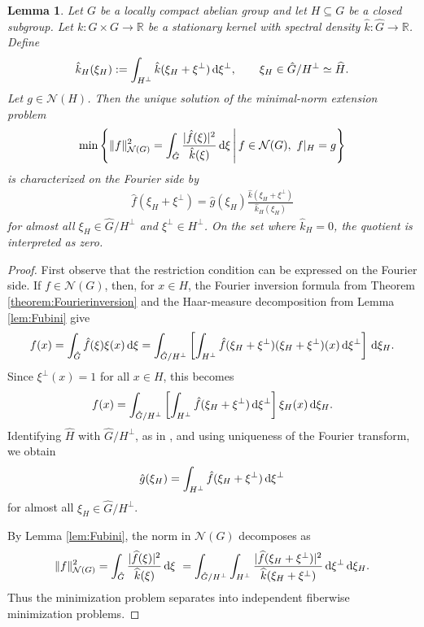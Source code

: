 \documentclass{article}
\renewcommand{\d}{\, \textup{d}}
\newtheorem{lemma}[theorem]{Lemma}
\newcommand{\R}{\mathbb{R}}
\begin{document}
\begin{appendices}
\begin{lemma}\label{lem:minimizationproblem}
Let $G$ be a locally compact abelian group and let $H\subseteq G$ be a closed subgroup. Let $k:G \times G \to \R$ be a stationary kernel with spectral density $\hat{k}:\hat{G} \to \R$.
Define
\begin{align*}
    \hat k_H(\xi_H)
:=
\int_{H^\perp}
\hat k(\xi_H+\xi^\perp) \d\xi^\perp,
\qquad
\xi_H\in \hat G/H^\perp\simeq \widehat H.
\end{align*}
Let $g\in\mathcal N(H)$. Then the unique solution of the minimal-norm extension problem
\begin{align*}
    \min
\left\{
\Vert f\Vert_{\mathcal N(G)}^2
=
\int_{\hat G}
\frac{|\hat f(\xi)|^2}{\hat k(\xi)} \d\xi
 \, \middle| \, 
f\in\mathcal N(G),\ f|_H=g \right\}
\end{align*}
is characterized on the Fourier side by
\begin{align*}
    \hat f(\xi_H+\xi^\perp)
=
\hat g(\xi_H)
\frac{\hat k(\xi_H+\xi^\perp)}
{\hat k_H(\xi_H)}
\end{align*}
for almost all $\xi_H\in \hat G/H^\perp$ and $\xi^\perp\in H^\perp$. On the set where $\hat k_H=0$, the quotient is interpreted as zero.
\end{lemma}
\begin{proof}
First observe that the restriction condition can be expressed on the Fourier side. If $f\in\mathcal N(G)$, then, for $x\in H$, the Fourier inversion formula from Theorem \ref{theorem:Fourierinversion} and the Haar-measure decomposition from Lemma \ref{lem:Fubini} give
\begin{align*}
    f(x) 
    = \int_{\hat{G}}    \hat{f}(\xi) \xi(x) \d \xi 
 = \int_{\hat{G}/H^\perp} \left[\int_{H^\perp} \hat{f}(\xi_H + \xi^\perp) (\xi_H+\xi^\perp)(x) \d \xi^\perp \right] \d \xi_H.
\end{align*}
Since $\xi^\perp(x)=1$ for all $x\in H$, this becomes
\begin{align*}
f(x) = \int_{\hat{G}/H^\perp} \left[ \int_{H^\perp} \hat{f}(\xi_H+\xi^\perp) \d \xi^\perp \right] \xi_H(x) \d \xi_H.
\end{align*}
Identifying $\hat H$ with $\hat G/H^\perp$, as in \cite[Theorem 4.39]{Folland}, and using uniqueness of the Fourier transform, we obtain
\begin{align*}
    \hat g(\xi_H)
=
\int_{H^\perp}
\hat f(\xi_H+\xi^\perp) \d\xi^\perp
\end{align*}
for almost all $\xi_H \in \hat{G}/H^\perp$.

By Lemma \ref{lem:Fubini}, the norm in $\mathcal N(G)$ decomposes as 
\begin{align*}
    \Vert f\Vert_{\mathcal N(G)}^2
=
\int_{\hat G}
\frac{|\widehat f(\xi)|^2}{\widehat k(\xi)} \d\xi \
=
\int_{\hat G/H^\perp}
\int_{H^\perp}
\frac{
|\widehat f(\xi_H+\xi^\perp)|^2
}{
\widehat k(\xi_H+\xi^\perp)
}
\d\xi^\perp \d\xi_H .
\end{align*}
Thus the minimization problem separates into independent fiberwise minimization problems. 


\end{proof}
\end{appendices}
\end{document}

